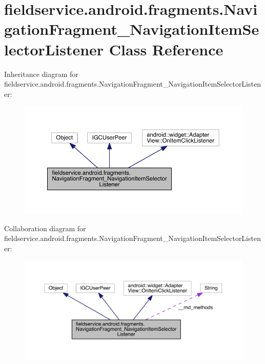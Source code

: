 \hypertarget{classfieldservice_1_1android_1_1fragments_1_1_navigation_fragment___navigation_item_selector_listener}{\section{fieldservice.\+android.\+fragments.\+Navigation\+Fragment\+\_\+\+Navigation\+Item\+Selector\+Listener Class Reference}
\label{classfieldservice_1_1android_1_1fragments_1_1_navigation_fragment___navigation_item_selector_listener}
}


Inheritance diagram for fieldservice.\+android.\+fragments.\+Navigation\+Fragment\+\_\+\+Navigation\+Item\+Selector\+Listener\+:
\nopagebreak
\begin{figure}[H]
\begin{center}
\leavevmode
\includegraphics[width=350pt]{classfieldservice_1_1android_1_1fragments_1_1_navigation_fragment___navigation_item_selector_listener__inherit__graph}
\end{center}
\end{figure}


Collaboration diagram for fieldservice.\+android.\+fragments.\+Navigation\+Fragment\+\_\+\+Navigation\+Item\+Selector\+Listener\+:
\nopagebreak
\begin{figure}[H]
\begin{center}
\leavevmode
\includegraphics[width=350pt]{classfieldservice_1_1android_1_1fragments_1_1_navigation_fragment___navigation_item_selector_listener__coll__graph}
\end{center}
\end{figure}
